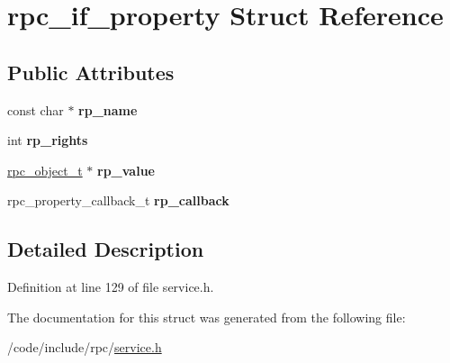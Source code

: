 \hypertarget{structrpc__if__property}{}\section{rpc\+\_\+if\+\_\+property Struct Reference}
\label{structrpc__if__property}
\subsection*{Public Attributes}
\begin{DoxyCompactItemize}
\item 
const char $\ast$ {\bfseries rp\+\_\+name}\hypertarget{structrpc__if__property_a5482e72e7b9df03cba9e3b86a4aa162c}{}\label{structrpc__if__property_a5482e72e7b9df03cba9e3b86a4aa162c}

\item 
int {\bfseries rp\+\_\+rights}\hypertarget{structrpc__if__property_a0dd3d4d8df815f4ea8572d50597a42d6}{}\label{structrpc__if__property_a0dd3d4d8df815f4ea8572d50597a42d6}

\item 
\hyperlink{object_8h_ab365f726b4975c0c8376b808d111d01b}{rpc\+\_\+object\+\_\+t} $\ast$ {\bfseries rp\+\_\+value}\hypertarget{structrpc__if__property_ad4d7d13c041e10d49a211d12199402a0}{}\label{structrpc__if__property_ad4d7d13c041e10d49a211d12199402a0}

\item 
rpc\+\_\+property\+\_\+callback\+\_\+t {\bfseries rp\+\_\+callback}\hypertarget{structrpc__if__property_aaa2ec96dc971abaabb7a8f67944d8584}{}\label{structrpc__if__property_aaa2ec96dc971abaabb7a8f67944d8584}

\end{DoxyCompactItemize}


\subsection{Detailed Description}


Definition at line 129 of file service.\+h.



The documentation for this struct was generated from the following file\+:\begin{DoxyCompactItemize}
\item 
/code/include/rpc/\hyperlink{service_8h}{service.\+h}\end{DoxyCompactItemize}
